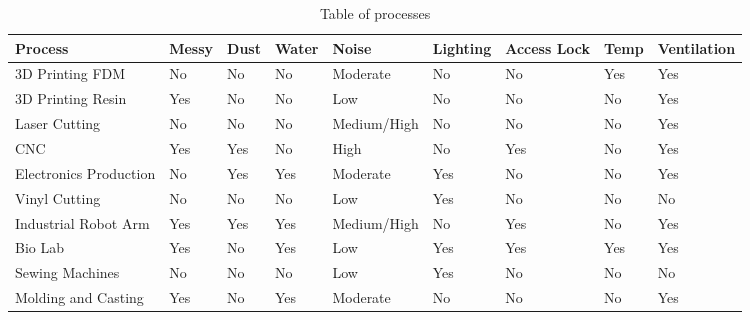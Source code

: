 \documentclass[a4paper,12pt,titlepage]{article}
\begin{document}
\begin{landscape}
\begin{table}[]
\centering
\begin{tabular}{@{}lllllllll@{}}
\toprule
Process                & Messy & Dust & Water & Noise       & Lighting & Access Lock & Temp & Ventilation \\ \midrule
3D Printing FDM        & No    & No   & No    & Moderate    & No       & No          & Yes           & Yes \\
3D Printing Resin      & Yes   & No   & No    & Low         & No       & No          & No            & Yes         \\
Laser Cutting          & No    & No   & No    & Medium/High & No       & No          & No            & Yes         \\
CNC                    & Yes   & Yes  & No    & High        & No       & Yes         & No            & Yes         \\
Electronics Production & No    & Yes  & Yes   & Moderate    & Yes      & No          & No            & Yes         \\
Vinyl Cutting          & No    & No   & No    & Low         & Yes      & No          & No            & No          \\
Industrial Robot Arm   & Yes   & Yes  & Yes   & Medium/High & No       & Yes         & No            & Yes         \\
Bio Lab                & Yes   & No   & Yes   & Low         & Yes      & Yes         & Yes           & Yes         \\
Sewing Machines        & No    & No   & No    & Low         & Yes      & No          & No            & No          \\
Molding and Casting    & Yes   & No   & Yes   & Moderate    & No       & No          & No            & Yes         \\ \bottomrule
\end{tabular}
\caption{Table of processes}
\label{processes}
\end{table}
\end{landscape}
\end{document}
